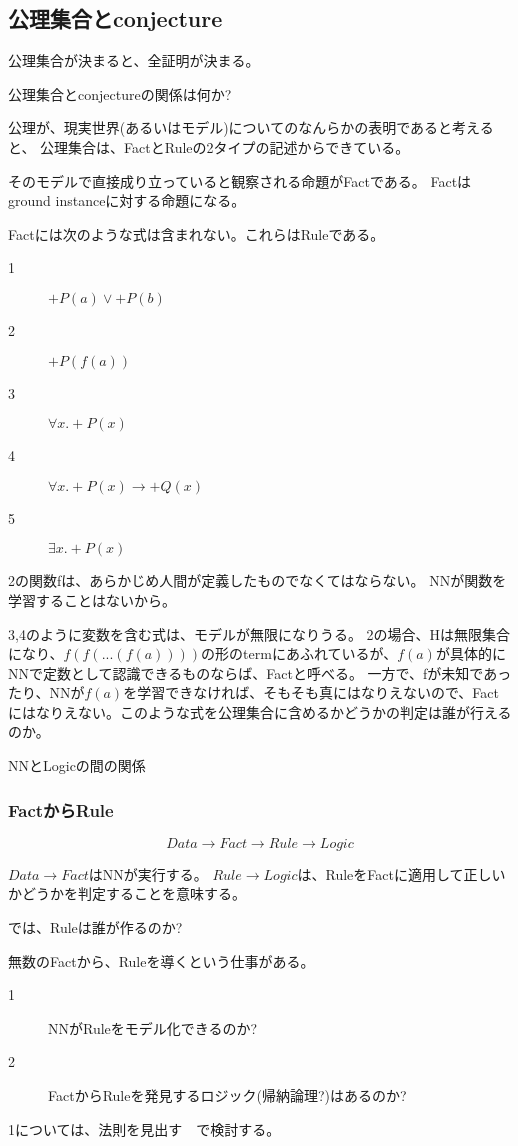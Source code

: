 \documentclass[10pt, oneside]{jarticle}   	%
\begin{document}
\subsection{公理集合とconjecture}

公理集合が決まると、全証明が決まる。

公理集合とconjectureの関係は何か?

公理が、現実世界(あるいはモデル)についてのなんらかの表明であると考えると、
公理集合は、FactとRuleの2タイプの記述からできている。

そのモデルで直接成り立っていると観察される命題がFactである。
Factはground instanceに対する命題になる。

Factには次のような式は含まれない。これらはRuleである。
\begin{description}
\item[ 1] $+P(a) \lor +P(b)$
\item[ 2] $+P(f(a))$
\item[ 3] $\forall x.+P(x)$
\item[ 4] $\forall x.+P(x) \to +Q(x)$
\item[ 5] $\exists x.+P(x) $
\end{description}

2の関数fは、あらかじめ人間が定義したものでなくてはならない。
NNが関数を学習することはないから。

3,4のように変数を含む式は、モデルが無限になりうる。
2の場合、Hは無限集合になり、$f(f(...(f(a))))$の形のtermにあふれているが、$f(a)$が具体的にNNで定数として認識できるものならば、Factと呼べる。
一方で、fが未知であったり、NNが$f(a)$を学習できなければ、そもそも真にはなりえないので、Factにはなりえない。このような式を公理集合に含めるかどうかの判定は誰が行えるのか。

NNとLogicの間の関係

\subsubsection{FactからRule}
$$ Data \to Fact \to Rule \to Logic$$

$ Data \to Fact$はNNが実行する。
$ Rule \to Logic$は、RuleをFactに適用して正しいかどうかを判定することを意味する。

では、Ruleは誰が作るのか?

無数のFactから、Ruleを導くという仕事がある。

\begin{description}
\item[ 1] NNがRuleをモデル化できるのか?
\item[ 2] FactからRuleを発見するロジック(帰納論理?)はあるのか?
\end{description}
1については、法則を見出す　で検討する。
\end{document}

